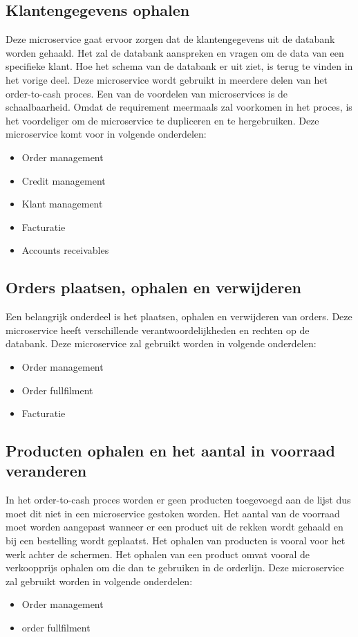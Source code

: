 \subsection{Klantengegevens ophalen}
Deze microservice gaat ervoor zorgen dat de klantengegevens uit de databank worden gehaald. Het zal de databank aanspreken en vragen om de data van een specifieke klant. 
Hoe het schema van de databank er uit ziet, is terug te vinden in het vorige deel. 
Deze microservice wordt gebruikt in meerdere delen van het order-to-cash proces. Een van de voordelen van microservices is de schaalbaarheid. Omdat de requirement meermaals zal voorkomen in het proces, is het voordeliger om de microservice te dupliceren en te hergebruiken. 
Deze microservice komt voor in volgende onderdelen:
\begin{itemize}
	\item Order management
	\item Credit management
	\item Klant management
	\item Facturatie
	\item Accounts receivables
\end{itemize}

\subsection{Orders plaatsen, ophalen en verwijderen}
Een belangrijk onderdeel is het plaatsen, ophalen en verwijderen van orders. Deze microservice heeft verschillende verantwoordelijkheden en rechten op de databank. 
Deze microservice zal gebruikt worden in volgende onderdelen:
\begin{itemize}
	\item Order management
	\item Order fullfilment
	\item Facturatie
\end{itemize}

\subsection{Producten ophalen en het aantal in voorraad veranderen}
In het order-to-cash proces worden er geen producten toegevoegd aan de lijst dus moet dit niet in een microservice gestoken worden. Het aantal van de voorraad moet worden aangepast wanneer er een product uit de rekken wordt gehaald en bij een bestelling wordt geplaatst. Het ophalen van producten is vooral voor het werk achter de schermen. Het ophalen van een product omvat vooral de verkoopprijs ophalen om die dan te gebruiken in de orderlijn. 
Deze microservice zal gebruikt worden in volgende onderdelen:
\begin{itemize}
	\item Order management
	\item order fullfilment
\end{itemize}

